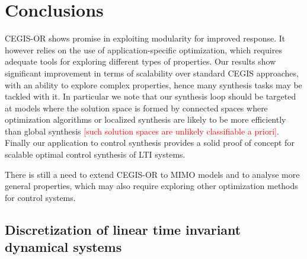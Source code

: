 \documentclass[sigconf]{llncs}
\renewcommand{\note}[1]{\textcolor{red}{[#1]}}
\begin{document}
\section{Conclusions}
\label{sec:conclusions}

CEGIS-OR shows promise in exploiting modularity for improved response. 
It however relies on the use of application-specific optimization, 
which requires adequate tools for exploring different types of properties.  
Our results show significant improvement in terms of scalability over standard CEGIS approaches, 
with an ability to explore complex properties, hence many synthesis tasks may be tackled with it. 
In particular we note that our synthesis loop should be targeted at 
models where the solution space is formed by connected spaces where
optimization algorithms or localized synthesis are likely to be more
efficiently than global synthesis \note{such solution spaces are unlikely classifiable a priori}. 
Finally our application to control synthesis provides a solid proof
of concept for scalable optimal control synthesis of LTI systems. 

There is still a need to extend CEGIS-OR to MIMO models and to analyse more general properties, 
which may also require exploring other optimization methods for control systems. 

\newpage


\newpage
\appendix

\subsection{Discretization of linear time invariant dynamical systems}\label{sec:continuous_LTI}
\end{document}
